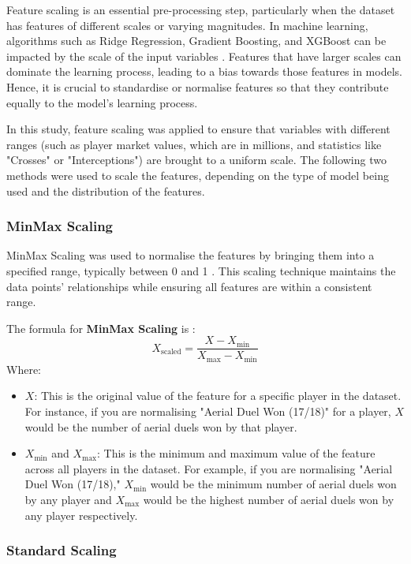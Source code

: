 \documentclass[12pt, a4paper,oneside]{book}
\numberwithin{equation}{section}
\begin{document}
Feature scaling is an essential pre-processing step, particularly when the dataset has features of different scales or varying magnitudes. In machine learning, algorithms such as Ridge Regression, Gradient Boosting, and XGBoost can be impacted by the scale of the input variables \cite{singh2018}. Features that have larger scales can dominate the learning process, leading to a bias towards those features in models. Hence, it is crucial to standardise or normalise features so that they contribute equally to the model's learning process.

In this study, feature scaling was applied to ensure that variables with different ranges (such as player market values, which are in millions, and statistics like "Crosses" or "Interceptions") are brought to a uniform scale. The following two methods were used to scale the features, depending on the type of model being used and the distribution of the features.

\subsubsection{MinMax Scaling}

MinMax Scaling was used to normalise the features by bringing them into a specified range, typically between 0 and 1 \cite{james2013}. This scaling technique maintains the data points' relationships while ensuring all features are within a consistent range. 

The formula for \textbf{MinMax Scaling} is \cite{zhang2020}:
\[X_{\text{scaled}} = \frac{X - X_{\text{min}}}{X_{\text{max}} - X_{\text{min}}}\]
Where:
\begin{itemize}
    \item \textbf{$X$}: This is the original value of the feature for a specific player in the dataset. For instance, if you are normalising "Aerial Duel Won (17/18)" for a player, $X$ would be the number of aerial duels won by that player.
    \item \textbf{$X_{\text{min}}$} and \textbf{$X_{\text{max}}$}: This is the minimum and maximum value of the feature across all players in the dataset. For example, if you are normalising "Aerial Duel Won (17/18)," $X_{\text{min}}$ would be the minimum number of aerial duels won by any player and $X_{\text{max}}$ would be the highest number of aerial duels won by any player respectively.
\end{itemize}

\subsubsection{Standard Scaling}
\end{document}
